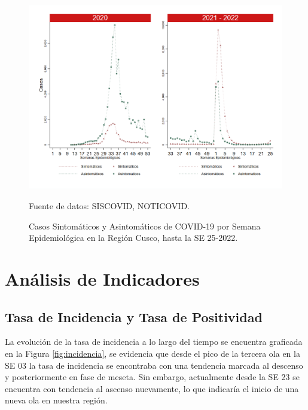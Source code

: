 \documentclass[12pt,a4paper,openany]{book}
\begin{document}
	\begin{figure}[h]
		\caption{Casos Sintomáticos y Asintomáticos de COVID-19 por Semana Epidemiológica en la Región Cusco, hasta la SE 25-2022.  }\label{fig:sintomaticos_asintomati}
		
		\begin{center}
			\includegraphics[width=0.75\linewidth]{../figuras/sintomaticos_20_21_22.png}
		\end{center}
		{\footnotesize {Fuente de datos: SISCOVID, NOTICOVID.}}
	\end{figure}
	\clearpage
	
	
	
	\clearpage
	
	\section*{Análisis de Indicadores}
	\subsection*{Tasa de Incidencia y Tasa de Positividad}
	\noindent La evolución de la tasa de incidencia a lo largo del tiempo se encuentra graficada en la Figura \ref{fig:incidencia}, se evidencia que desde el pico de la tercera ola en la SE 03 la tasa de incidencia se encontraba con una tendencia marcada al descenso y posteriormente en fase de meseta. Sin embargo, actualmente desde la SE 23 se encuentra con tendencia al ascenso nuevamente, lo que indicaría el inicio de una nueva ola en nuestra región.
	
\end{document}

